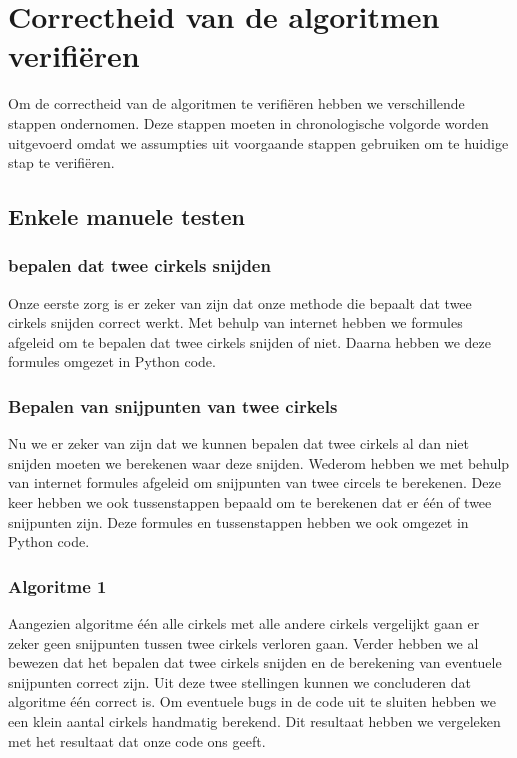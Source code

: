\documentclass[11pt,a4paper]{article}
\begin{document}
\section{Correctheid van de algoritmen verifi\"eren}

Om de correctheid van de algoritmen te verifi\"eren hebben we verschillende stappen ondernomen. Deze stappen moeten in chronologische volgorde worden uitgevoerd omdat we assumpties uit voorgaande stappen gebruiken om te huidige stap te verifi\"eren.

\subsection{Enkele manuele testen}

\subsubsection*{bepalen dat twee cirkels snijden}

Onze eerste zorg is er zeker van zijn dat onze methode die bepaalt dat twee cirkels snijden correct werkt. Met behulp van internet hebben we formules afgeleid om te bepalen dat twee cirkels snijden of niet. Daarna hebben we deze formules omgezet in Python code.

\subsubsection*{Bepalen van snijpunten van twee cirkels}

Nu we er zeker van zijn dat we kunnen bepalen dat twee cirkels al dan niet snijden moeten we berekenen waar deze snijden. Wederom hebben we met behulp van internet formules afgeleid om snijpunten van twee circels te berekenen. Deze keer hebben we ook tussenstappen bepaald om te berekenen dat er \'e\'en of twee snijpunten zijn. Deze formules en tussenstappen hebben we ook omgezet in Python code.

\subsubsection*{Algoritme 1}

Aangezien algoritme \'e\'en alle cirkels met alle andere cirkels vergelijkt gaan er zeker geen snijpunten tussen twee cirkels verloren gaan. Verder hebben we al bewezen dat het bepalen dat twee cirkels snijden en de berekening van eventuele snijpunten correct zijn. Uit deze twee stellingen kunnen we concluderen dat algoritme \'e\'en correct is.
Om eventuele bugs in de code uit te sluiten hebben we een klein aantal cirkels handmatig berekend. Dit resultaat hebben we vergeleken met het resultaat dat onze code ons geeft.
\end{document}

